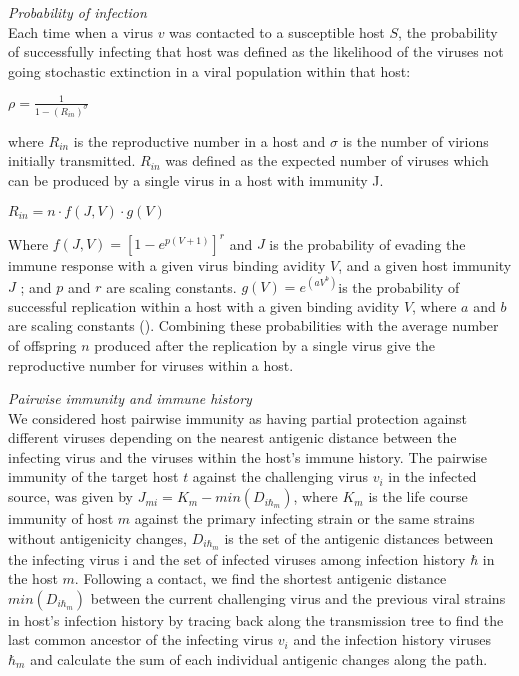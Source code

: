 \documentclass[12pt,a4paper]{article}
\begin{document}
\textit{Probability of infection} \\
Each time when a virus $v$ was contacted to a susceptible host $S$, the probability of successfully infecting that host was defined as the likelihood of the viruses not going stochastic extinction in a viral population within that host:

$\rho = \frac{1}{1-(R_{in})^\sigma}$

where $R_{in}$ is the reproductive number in a host and $\sigma$ is the number of virions initially transmitted. $R_{in}$ was defined as the expected number of viruses which can be produced by a single virus in a host with immunity J.

$R_{in}=n \cdot f(J,V) \cdot g(V)$



Where $f(J,V) = [1 - e^{p(V+1)}]^r$ and $J$ is the probability of evading the immune response with a given virus binding avidity $V$, and a given host immunity $J$ ;  and $p$ and $r$ are scaling constants. $g(V) = e^{(aV^b)}$is the probability of successful replication within a host with a given binding avidity $V$, where $a$ and $b$ are scaling constants (\cite{Yuan2013}). Combining these probabilities with the average number of offspring $n$ produced after the replication by a single virus give the reproductive number for viruses within a host.


\textit{Pairwise immunity and immune history} \\
We considered host pairwise immunity as having partial protection against different viruses depending on the nearest antigenic distance between the infecting virus and the viruses within the host’s immune history. The pairwise immunity of the target host $t$ against the challenging virus $v_{i}$ in the infected source, was given by $J_{mi}=K_{m}-min(D_{i\hbar_{m}})$, where $K_{m}$ is the life course immunity of host $m$ against the primary infecting strain or the same strains without antigenicity changes, $D_{i\hbar_{m}}$ is the set of the antigenic distances between the infecting virus i and the set of infected viruses among infection history $\hbar$ in the host $m$. Following a contact, we find the shortest antigenic distance $min(D_{i\hbar_{m}})$ between the current challenging virus and the previous viral strains in host’s infection history by tracing back along the transmission tree to find the last common ancestor of the infecting virus $v_{i}$ and the infection history viruses $\hbar_{m}$ and calculate the sum of each individual antigenic changes along the path.
\end{document}
